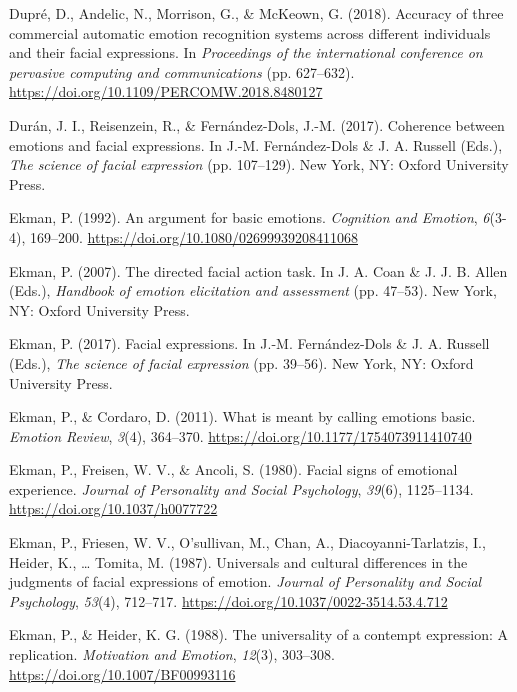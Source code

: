 \documentclass[
  english,
  doc]{apa7}
\newlength{\cslhangindent}
\newenvironment{cslreferences}%
  {\setlength{\parindent}{0pt}%
  \everypar{\setlength{\hangindent}{\cslhangindent}}\ignorespaces}%
  {\par}
\begin{document}
\begin{cslreferences}
\leavevmode\hypertarget{ref-dupre2018accuracy}{}%
Dupré, D., Andelic, N., Morrison, G., \& McKeown, G. (2018). Accuracy of three commercial automatic emotion recognition systems across different individuals and their facial expressions. In \emph{Proceedings of the international conference on pervasive computing and communications} (pp. 627--632). \url{https://doi.org/10.1109/PERCOMW.2018.8480127}

\leavevmode\hypertarget{ref-duran2017coherence}{}%
Durán, J. I., Reisenzein, R., \& Fernández-Dols, J.-M. (2017). Coherence between emotions and facial expressions. In J.-M. Fernández-Dols \& J. A. Russell (Eds.), \emph{The science of facial expression} (pp. 107--129). New York, NY: Oxford University Press.

\leavevmode\hypertarget{ref-ekman1992argument}{}%
Ekman, P. (1992). An argument for basic emotions. \emph{Cognition and Emotion}, \emph{6}(3-4), 169--200. \url{https://doi.org/10.1080/02699939208411068}

\leavevmode\hypertarget{ref-ekman2007directed}{}%
Ekman, P. (2007). The directed facial action task. In J. A. Coan \& J. J. B. Allen (Eds.), \emph{Handbook of emotion elicitation and assessment} (pp. 47--53). New York, NY: Oxford University Press.

\leavevmode\hypertarget{ref-ekman2017facial}{}%
Ekman, P. (2017). Facial expressions. In J.-M. Fernández-Dols \& J. A. Russell (Eds.), \emph{The science of facial expression} (pp. 39--56). New York, NY: Oxford University Press.

\leavevmode\hypertarget{ref-ekman2011meant}{}%
Ekman, P., \& Cordaro, D. (2011). What is meant by calling emotions basic. \emph{Emotion Review}, \emph{3}(4), 364--370. \url{https://doi.org/10.1177/1754073911410740}

\leavevmode\hypertarget{ref-ekman1980facial}{}%
Ekman, P., Freisen, W. V., \& Ancoli, S. (1980). Facial signs of emotional experience. \emph{Journal of Personality and Social Psychology}, \emph{39}(6), 1125--1134. \url{https://doi.org/10.1037/h0077722}

\leavevmode\hypertarget{ref-ekman1987universals}{}%
Ekman, P., Friesen, W. V., O'sullivan, M., Chan, A., Diacoyanni-Tarlatzis, I., Heider, K., \ldots{} Tomita, M. (1987). Universals and cultural differences in the judgments of facial expressions of emotion. \emph{Journal of Personality and Social Psychology}, \emph{53}(4), 712--717. \url{https://doi.org/10.1037/0022-3514.53.4.712}

\leavevmode\hypertarget{ref-ekman1988universality}{}%
Ekman, P., \& Heider, K. G. (1988). The universality of a contempt expression: A replication. \emph{Motivation and Emotion}, \emph{12}(3), 303--308. \url{https://doi.org/10.1007/BF00993116}


\end{cslreferences}
\end{document}
